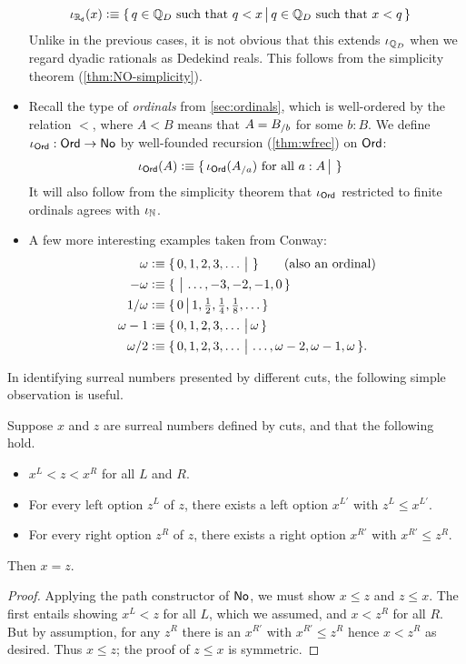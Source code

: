 \begin{itemize}
  \begin{align*}
    \iota_{\mathbb{R}_\mathsf{d}}(x) &\vcentcolon\equiv
    \{\,q\in\mathbb{Q}_D \text{ such that } q<x\,\big|\,q\in\mathbb{Q}_D \text{ such that } x<q\,\}
  \end{align*}
  Unlike in the previous cases, it is not obvious that this extends $\iota_{\mathbb{Q}_D}$ when we regard dyadic rationals as Dedekind reals.
  This follows from the simplicity theorem (\autoref{thm:NO-simplicity}).
\item Recall the type \ord of \emph{ordinals} from \autoref{sec:ordinals}, which is well-ordered by the relation $<$, where $A<B$ means that $A = {B}_{/b}$ for some $b:B$.
  We define $\iota_{\mathsf{Ord}}:\mathsf{Ord}\to\mathsf{No}$ by well-founded recursion (\autoref{thm:wfrec}) on $\mathsf{Ord}$:
  \begin{align*}
    \iota_{\mathsf{Ord}}(A) &\vcentcolon\equiv
    \{\,\iota_\mathsf{Ord}({A}_{/a}) \text{ for all } a:A\,\big|\,\,\}
  \end{align*}
  It will also follow from the simplicity theorem that $\iota_\mathsf{Ord}$ restricted to finite ordinals agrees with $\iota_\mathbb{N}$.
\item A few more interesting examples taken from Conway:
  \begin{align*}
    \omega &\vcentcolon\equiv \{\,0,1,2,3,\dots\,\big|\,\,\} \qquad\text{(also an ordinal)}\\
    -\omega &\vcentcolon\equiv \{\,\,\big|\,\dots,-3,-2,-1,0\,\}\\
    1/\omega &\vcentcolon\equiv \textstyle\{\,0\,\big|\,1,\frac12,\frac14,\frac18,\dots\,\}\\
    \omega-1 &\vcentcolon\equiv \{\,0,1,2,3,\dots\,\big|\,\omega\,\}\\
    \omega/2 &\vcentcolon\equiv \{\,0,1,2,3,\dots\,\big|\,\dots,\omega-2,\omega-1,\omega\,\}.
  \end{align*}
\end{itemize}

In identifying surreal numbers presented by different cuts, the following simple observation is useful.

\begin{thm}\label{thm:NO-simplicity}
  Suppose $x$ and $z$ are surreal numbers defined by cuts, and that the following hold.
  \begin{itemize}
  \item $x^L < z < x^R$ for all $L$ and $R$.
  \item For every left option $z^L$ of $z$, there exists a left option $x^{L'}$ with $z^L\le x^{L'}$.
  \item For every right option $z^R$ of $z$, there exists a right option $x^{R'}$ with $x^{R'}\le z^R$.
  \end{itemize}
  Then $x=z$.
\end{thm}
\begin{proof}
  Applying the path constructor of $\mathsf{No}$, we must show $x\le z$ and $z\le x$.
  The first entails showing $x^L<z$ for all $L$, which we assumed, and $x<z^R$ for all $R$.
  But by assumption, for any $z^R$ there is an $x^{R'}$ with $x^{R'}\le z^R$ hence $x<z^R$ as desired.
  Thus $x\le z$; the proof of $z\le x$ is symmetric.
\end{proof}

